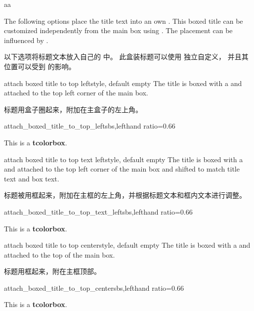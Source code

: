aa

The following options place the title text into an own .
This boxed title can be customized independently from the main box using
.
The placement can be influenced by .

以下选项将标题文本放入自己的  中。 此盒装标题可以使用  独立自定义， 并且其位置可以受到  的影响。

\begin{docTcbKey}{attach boxed title to top left}{}{style, default empty}
The title is boxed with a  and attached to
the top left corner of the main box.

标题用盒子圈起来，附加在主盒子的左上角。
\begin{exdispExample*}{attach_boxed_title_to_top_left}{sbs,lefthand ratio=0.66}
\begin{tcolorbox}[enhanced,title=My title,
  attach boxed title to top left]
  This is a \textbf{tcolorbox}.
\end{tcolorbox}
\end{exdispExample*}
\end{docTcbKey}

\begin{docTcbKey}[][doc new=2021-07-30]{attach boxed title to top text left}{}{style, default empty}
The title is boxed with a  and attached to
the top left corner of the main box
and shifted to match title text and box text.

标题被用框起来，附加在主框的左上角，并根据标题文本和框内文本进行调整。

\begin{exdispExample*}{attach_boxed_title_to_top_text_left}{sbs,lefthand ratio=0.66}
\begin{tcolorbox}[enhanced,title=My title,
  attach boxed title to top text left]
  This is a \textbf{tcolorbox}.
\end{tcolorbox}
\end{exdispExample*}
\end{docTcbKey}

\begin{docTcbKey}{attach boxed title to top center}{}{style, default empty}
The title is boxed with a  and attached to
the top of the main box.

标题用框起来，附在主框顶部。
\begin{exdispExample*}{attach_boxed_title_to_top_center}{sbs,lefthand ratio=0.66}
\begin{tcolorbox}[enhanced,title=My title,
  attach boxed title to top center]
  This is a \textbf{tcolorbox}.
\end{tcolorbox}
\end{exdispExample*}
\end{docTcbKey}

